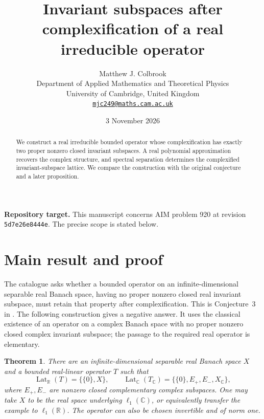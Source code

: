 \documentclass[11pt,a4paper]{article}
\title{\textbf{Invariant subspaces after complexification of a real irreducible operator}}
\author{Matthew J. Colbrook\\[3pt]
{\small Department of Applied Mathematics and Theoretical Physics}\\
{\small University of Cambridge, United Kingdom}\\
{\small\href{mailto:mjc249@maths.cam.ac.uk}{\texttt{mjc249@maths.cam.ac.uk}}}}
\date{3 November 2026}
\newtheorem{theorem}{Theorem}[section]
\theoremstyle{remark}
\begin{document}
\maketitle
\begin{abstract}
We construct a real irreducible bounded operator whose complexification has exactly two proper nonzero closed invariant subspaces. A real polynomial approximation recovers the complex structure, and spectral separation determines the complexified invariant-subspace lattice. We compare the construction with the original conjecture and a later proposition.
\end{abstract}
\noindent\textbf{Repository target.}
This manuscript concerns AIM problem 920 at revision
\texttt{5d7e26e8444e}. The precise scope is stated below.
\medskip

\section{Main result and proof}
\label{sec:920}

The catalogue asks whether a bounded operator on an infinite-dimensional
separable real Banach space, having no proper nonzero closed real
invariant subspace, must retain that property after complexification.
This is Conjecture~3 in \cite{AAST2005}.  The following construction
gives a negative answer.  It uses the classical existence of an operator
on a complex Banach space with no proper nonzero closed complex invariant
subspace; the passage to the required real operator is elementary.

\begin{theorem}\label{thm:920}
There are an infinite-dimensional separable real Banach space $X$ and a
bounded real-linear operator $T$ such that
\[
 \operatorname{Lat}_{\mathbb R}(T)=\{\{0\},X\},
 \qquad
 \operatorname{Lat}_{\mathbb C}(T_{\mathbb C})
 =\{\{0\},E_+,E_-,X_{\mathbb C}\},
\]
where $E_+,E_-$ are nonzero closed complementary complex subspaces.
One may take $X$ to be the real space underlying $\ell_1(\mathbb C)$,
or equivalently transfer the example to $\ell_1(\mathbb R)$.
The operator can also be chosen invertible and of norm one.
\end{theorem}
\end{document}
